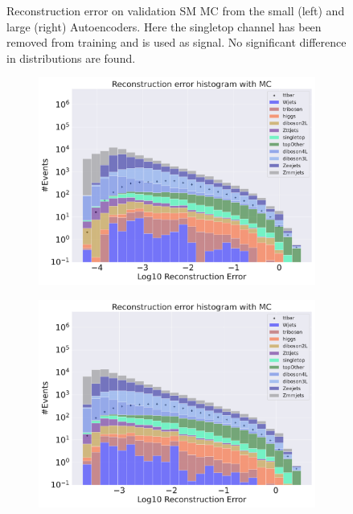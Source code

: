\begin{figure}[h!]
\begin{subfigure}{.45\textwidth}
        \caption{ }
        \label{fig:ae_big_singletop}
    \end{subfigure}
    \hfill
    \caption[AE | Reconstruction error using Singletop channel as signal]{Reconstruction error on validation SM MC from the small (left) and large (right) Autoencoders. Here the singletop channel has been removed from training and 
    is used as signal. No significant difference in distributions are found.  } 
    \label{fig:ae_big_channel_2}
\end{figure}

\begin{figure}[h!]
    \centering
    \begin{subfigure}{.45\textwidth}
        \includegraphics[width=\textwidth]{Figures/AE_testing/small/b_data_recon_big_rm3_feats_sig_ttbar.pdf}
        \caption{}
        \label{fig:ae_small_ttbar}
    \end{subfigure}
    \hfill 
    \begin{subfigure}{.45\textwidth}
        \includegraphics[width=\textwidth]{Figures/AE_testing/big/b_data_recon_big_rm3_feats_sig_ttbar.pdf}

\end{subfigure}
\end{figure}

